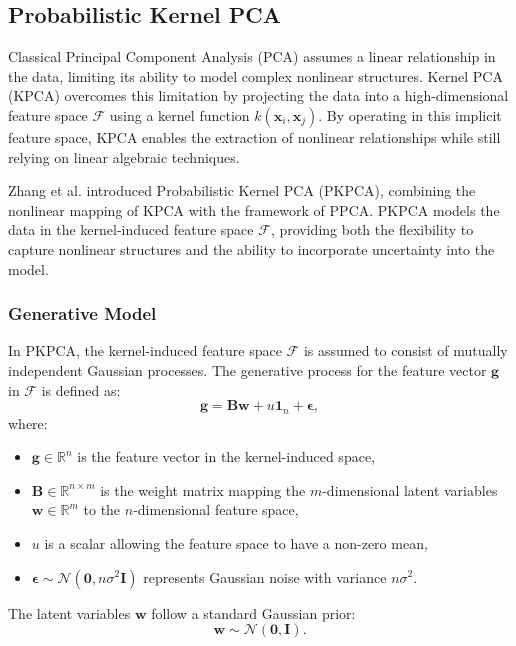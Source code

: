 \documentclass{article}
\begin{document}
    \subsection{Probabilistic Kernel PCA}

    Classical Principal Component Analysis (PCA) assumes a linear relationship in the data, limiting its ability to model complex nonlinear structures. Kernel PCA (KPCA) overcomes this limitation by projecting the data into a high-dimensional feature space \(\mathcal{F}\) using a kernel function \(k(\mathbf{x}_i, \mathbf{x}_j)\). By operating in this implicit feature space, KPCA enables the extraction of nonlinear relationships while still relying on linear algebraic techniques.
    
    Zhang et al. introduced Probabilistic Kernel PCA (PKPCA), combining the nonlinear mapping of KPCA with the framework of PPCA. PKPCA models the data in the kernel-induced feature space \(\mathcal{F}\), providing both the flexibility to capture nonlinear structures and the ability to incorporate uncertainty into the model.
    
    \subsubsection{Generative Model}

    In PKPCA, the kernel-induced feature space \(\mathcal{F}\) is assumed to consist of mutually independent Gaussian processes. The generative process for the feature vector \(\mathbf{g}\) in \(\mathcal{F}\) is defined as:
    \[
    \mathbf{g} = \mathbf{B} \mathbf{w} + u \mathbf{1}_n + \boldsymbol{\epsilon},
    \]
    where:
    \begin{itemize}
        \item \(\mathbf{g} \in \mathbb{R}^n\) is the feature vector in the kernel-induced space,
        \item \(\mathbf{B} \in \mathbb{R}^{n \times m}\) is the weight matrix mapping the \(m\)-dimensional latent variables \(\mathbf{w} \in \mathbb{R}^m\) to the \(n\)-dimensional feature space,
        \item \(u\) is a scalar allowing the feature space to have a non-zero mean,
        \item \(\boldsymbol{\epsilon} \sim \mathcal{N}(\mathbf{0}, n\sigma^2 \mathbf{I})\) represents Gaussian noise with variance \(n\sigma^2\).
    \end{itemize}
    
    The latent variables \(\mathbf{w}\) follow a standard Gaussian prior:
    \[
    \mathbf{w} \sim \mathcal{N}(\mathbf{0}, \mathbf{I}).
    \]
    
\end{document}
